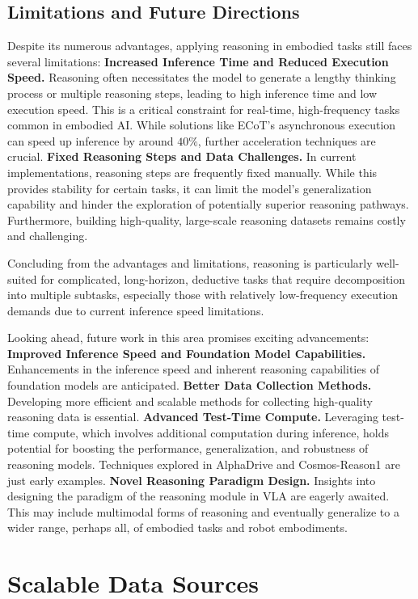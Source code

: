 \documentclass[10pt, a4paper, logo, copyright]{googledeepmind} %
\begin{document}
\subsection{Limitations and Future Directions}
Despite its numerous advantages, applying reasoning in embodied tasks still faces several limitations: \textbf{Increased Inference Time and Reduced Execution Speed.} Reasoning often necessitates the model to generate a lengthy thinking process or multiple reasoning steps, leading to high inference time and low execution speed. This is a critical constraint for real-time, high-frequency tasks common in embodied AI. While solutions like ECoT's asynchronous execution can speed up inference by around $40\%$, further acceleration techniques are crucial. 
\textbf{Fixed Reasoning Steps and Data Challenges.} In current implementations, reasoning steps are frequently fixed manually. While this provides stability for certain tasks, it can limit the model's generalization capability and hinder the exploration of potentially superior reasoning pathways. Furthermore, building high-quality, large-scale reasoning datasets remains costly and challenging.

Concluding from the advantages and limitations, reasoning is particularly well-suited for complicated, long-horizon, deductive tasks that require decomposition into multiple subtasks, especially those with relatively low-frequency execution demands due to current inference speed limitations.

Looking ahead, future work in this area promises exciting advancements:
\textbf{Improved Inference Speed and Foundation Model Capabilities.} Enhancements in the inference speed and inherent reasoning capabilities of foundation models are anticipated. \textbf{Better Data Collection Methods.} Developing more efficient and scalable methods for collecting high-quality reasoning data is essential. 
\textbf{Advanced Test-Time Compute.} Leveraging test-time compute, which involves additional computation during inference, holds potential for boosting the performance, generalization, and robustness of reasoning models. Techniques explored in AlphaDrive and Cosmos-Reason1 are just early examples. 
\textbf{Novel Reasoning Paradigm Design.} Insights into designing the paradigm of the reasoning module in VLA are eagerly awaited. This may include multimodal forms of reasoning and eventually generalize to a wider range, perhaps all, of embodied tasks and robot embodiments.


\section{Scalable Data Sources}
\label{sec:data}
\end{document}
